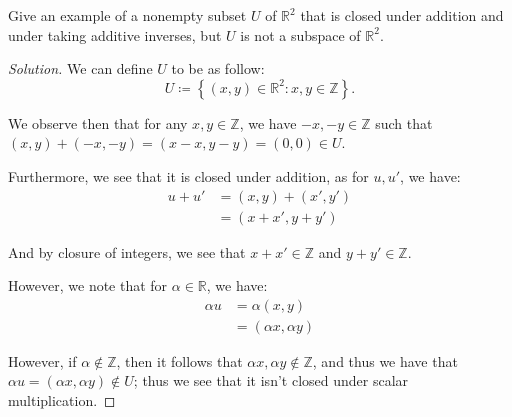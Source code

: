 \documentclass[openany]{book}
\newenvironment{solution}{\begin{proof}[Solution]}{\end{proof}}
\newcommand{\RR}{\mathbb{R}}
\newcommand{\ZZ}{\mathbb{Z}}
\begin{document}
	\begin{hw}
		Give an example of a nonempty subset $U$ of $\RR^{2}$ that is closed under addition and under taking additive inverses, but $U$ is not a subspace of $\RR^{2}$.
	\end{hw}
	\begin{solution}
		We can define $U$ to be as follow:
		\begin{equation*}
			U \coloneq \left\{  (x,y) \in \RR^{2} : x,y \in \ZZ \right\}.
		\end{equation*}
	
		We observe then that for any $x,y \in \ZZ$, we have $-x,-y \in \ZZ$ such that $(x,y) + (-x, -y) = (x - x, y - y) = (0,0) \in U$.
		
		Furthermore, we see that it is closed under addition, as for $u, u'$, we have:
		\begin{align*}
			u + u' &= (x, y) + (x', y') \\
			&= (x + x', y + y')
		\end{align*}
	
		And by closure of integers, we see that $x + x' \in \ZZ$ and $y + y' \in \ZZ$.
		
		However, we note that for $\alpha \in \RR$, we have:
		\begin{align*}
			\alpha u &= \alpha (x,y) \\
			&= (\alpha x, \alpha y)
		\end{align*}
	
		However, if $\alpha \not\in \ZZ$, then it follows that $\alpha x, \alpha y \not\in \ZZ$, and thus we have that $\alpha u = (\alpha x, \alpha y) \not\in U$; thus we see that it isn't closed under scalar multiplication.
	\end{solution}
\end{document}
